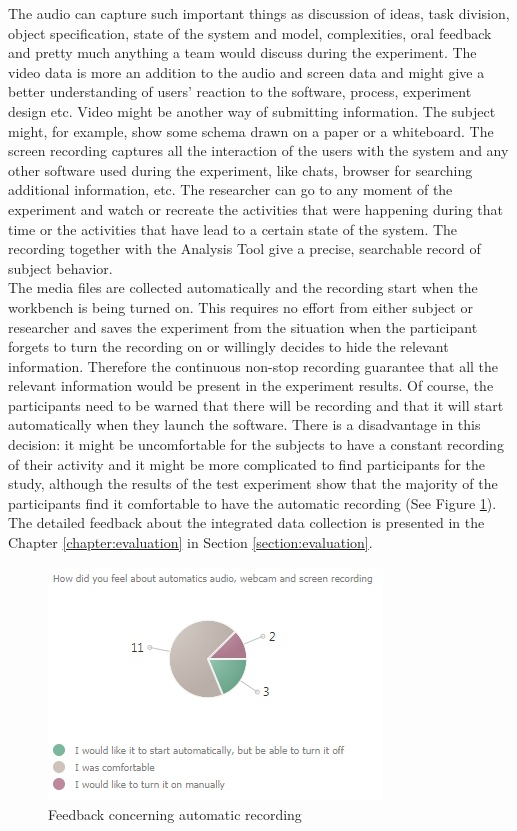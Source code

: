 The audio can capture such important things as discussion of ideas, task division, object specification, state of the system and model, complexities, oral feedback and pretty much anything a team would discuss during the experiment. The video data is more an addition to the audio and screen data and might give a better understanding of users' reaction to the software, process, experiment design etc. Video might be another way of submitting information. The subject might, for example, show some schema drawn on a paper or a whiteboard. The screen recording captures all the interaction of the users with the system and any other software used during the experiment, like chats, browser for searching additional information, etc. The researcher can go to any moment of the experiment and watch or recreate the activities that were happening during that time or the activities that have lead to a certain state of the system. The recording together with the Analysis Tool give a precise, searchable record of subject behavior.\\ 

The media files are collected automatically and the recording start when the workbench is being turned on. This requires no effort from either subject or researcher and saves the experiment from the situation when the participant forgets to turn the recording on or willingly decides to hide the relevant information. Therefore the continuous non-stop recording guarantee that all the relevant information would be present in the experiment results. Of course, the participants need to be warned that there will be recording and that it will start automatically when they launch the software. There is a disadvantage in this decision: it might be uncomfortable for the subjects to have a constant recording of their activity and it might be more complicated to find participants for the study, although the results of the test experiment show that the majority of the participants find it comfortable to have the automatic recording (See Figure \ref{fig:recording_feedback}). The detailed feedback about the integrated data collection is presented in the Chapter \ref{chapter:evaluation} in Section \ref{section:evaluation}.

   \begin{figure}[htb]
 \centering
\includegraphics{figures/recording_feedback.jpg}
\caption{Feedback concerning automatic recording}
\label{fig:recording_feedback}
 \end{figure}

